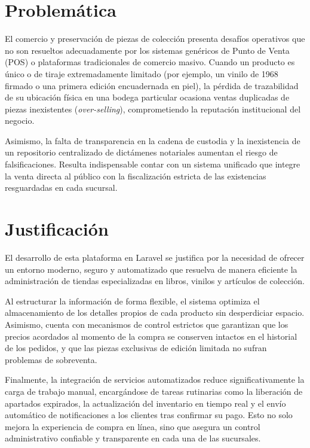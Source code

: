 \section{Problemática}
El comercio y preservación de piezas de colección presenta desafíos operativos que no son resueltos adecuadamente por los sistemas genéricos de Punto de Venta (POS) o plataformas tradicionales de comercio masivo. Cuando un producto es único o de tiraje extremadamente limitado (por ejemplo, un vinilo de 1968 firmado o una primera edición encuadernada en piel), la pérdida de trazabilidad de su ubicación física en una bodega particular ocasiona ventas duplicadas de piezas inexistentes (\textit{over-selling}), comprometiendo la reputación institucional del negocio. 

Asimismo, la falta de transparencia en la cadena de custodia y la inexistencia de un repositorio centralizado de dictámenes notariales aumentan el riesgo de falsificaciones. Resulta indispensable contar con un sistema unificado que integre la venta directa al público con la fiscalización estricta de las existencias resguardadas en cada sucursal.

\section{Justificación}
El desarrollo de esta plataforma en Laravel se justifica por la necesidad de ofrecer un entorno moderno, seguro y automatizado que resuelva de manera eficiente la administración de tiendas especializadas en libros, vinilos y artículos de colección.

Al estructurar la información de forma flexible, el sistema optimiza el almacenamiento de los detalles propios de cada producto sin desperdiciar espacio. Asimismo, cuenta con mecanismos de control estrictos que garantizan que los precios acordados al momento de la compra se conserven intactos en el historial de los pedidos, y que las piezas exclusivas de edición limitada no sufran problemas de sobreventa.

Finalmente, la integración de servicios automatizados reduce significativamente la carga de trabajo manual, encargándose de tareas rutinarias como la liberación de apartados expirados, la actualización del inventario en tiempo real y el envío automático de notificaciones a los clientes tras confirmar su pago. Esto no solo mejora la experiencia de compra en línea, sino que asegura un control administrativo confiable y transparente en cada una de las sucursales.
